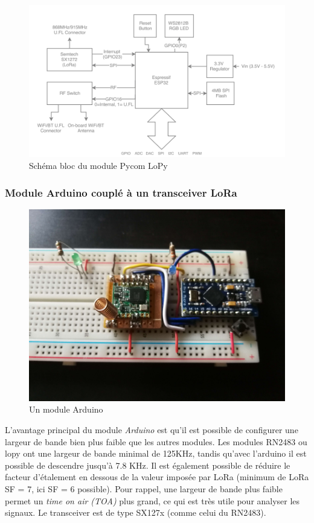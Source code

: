 \newpage

\begin{figure}[h]
\centering

\includegraphics[scale=1]{images/SBlopy.png}
\caption{Schéma bloc du module Pycom LoPy}\label{term3003}
\end{figure}

\subsubsection{Module Arduino couplé à un transceiver LoRa}\label{arduino}

\begin{figure}[h]
\centering

\includegraphics[scale=0.07]{images/arduino.png}
\caption{Un module Arduino}\label{term36}
\end{figure}

L'avantage principal du module \textit{Arduino} est qu'il est possible de configurer une largeur de bande bien plus faible que les autres modules. Les modules RN2483 ou lopy ont une largeur de bande minimal de 125KHz, tandis qu'avec l'arduino il est possible de descendre jusqu'à 7.8 KHz. Il est également possible de réduire le facteur d'étalement en dessous de la valeur imposée par LoRa (minimum de LoRa SF = 7, ici SF = 6 possible). Pour rappel, une largeur de bande plus faible permet un \textit{time on air (TOA)} plus grand, ce qui est très utile pour analyser les signaux. Le transceiver est de type SX127x (comme celui du RN2483).

